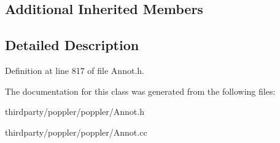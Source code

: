 \subsection*{Additional Inherited Members}


\subsection{Detailed Description}


Definition at line 817 of file Annot.\+h.



The documentation for this class was generated from the following files\+:\begin{DoxyCompactItemize}
\item 
thirdparty/poppler/poppler/Annot.\+h\item 
thirdparty/poppler/poppler/Annot.\+cc\end{DoxyCompactItemize}
